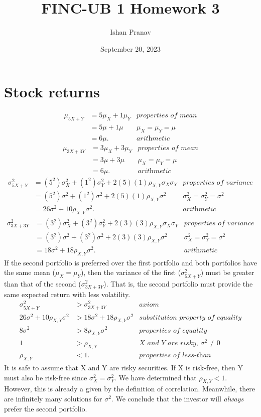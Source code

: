 \documentclass[12pt]{article}
\title{FINC-UB 1 Homework 3}
\author{Ishan Pranav}
\date{September 20, 2023}
\begin{document}
\maketitle
\section{Stock returns}
\begin{align*}
\mu_{5X+Y}
&=5\mu_X+1\mu_Y&\textit{properties of mean}\\
&=5\mu+1\mu&\textit{$\mu_X=\mu_Y=\mu$}\\
&=6\mu.&\textit{arithmetic}
\end{align*}
\begin{align*}
\mu_{3X+3Y}
&=3\mu_X+3\mu_Y&\textit{properties of mean}\\
&=3\mu+3\mu&\textit{$\mu_X=\mu_Y=\mu$}\\
&=6\mu.&\textit{arithmetic}
\end{align*}
\begin{align*}
\sigma_{5X+Y}^2
&=(5^2)\sigma_X^2+(1^2)\sigma_Y^2+2(5)(1)\rho_{X,Y}\sigma_X\sigma_Y&\textit{properties of variance}\\
&=(5^2)\sigma^2+(1^2)\sigma^2+2(5)(1)\rho_{X,Y}\sigma^2&\textit{$\sigma_X^2=\sigma_Y^2=\sigma^2$}\\
&=26\sigma^2+10\rho_{X,Y}\sigma^2.&\textit{arithmetic}
\end{align*}
\begin{align*}
\sigma_{3X+3Y}^2
&=(3^2)\sigma_X^2+(3^2)\sigma_Y^2+2(3)(3)\rho_{X,Y}\sigma_X\sigma_Y&\textit{properties of variance}\\
&=(3^2)\sigma^2+(3^2)\sigma^2+2(3)(3)\rho_{X,Y}\sigma^2&\textit{$\sigma_X^2=\sigma_Y^2=\sigma^2$}\\
&=18\sigma^2+18\rho_{X,Y}\sigma^2.&\textit{arithmetic}
\end{align*}
If the second portfolio is preferred over the first portfolio and both portfolios have the same mean ($\mu_X=\mu_Y$), then the variance of the first ($\sigma_{5X+Y}^2$) must be greater than that of the second ($\sigma_{3X+3Y}^2$). That is, the second portfolio must provide the same expected return with less volatility.
\begin{align*}
\sigma_{5X+Y}^2&>\sigma_{3X+3Y}^2&\textit{axiom}\\
26\sigma^2+10\rho_{X,Y}\sigma^2&>18\sigma^2+18\rho_{X,Y}\sigma^2&\textit{substitution property of equality}\\
8\sigma^2&>8\rho_{X,Y}\sigma^2&\textit{properties of equality}\\
1&>\rho_{X,Y}&\textit{X and Y are risky, $\sigma^2\neq 0$}\\
\rho_{X,Y}&<1.&\textit{properties of less-than}
\end{align*}
It is safe to assume that X and Y are risky securities. If X is risk-free, then Y must also be risk-free since $\sigma_X^2=\sigma_Y^2$. We have determined that $\rho_{X,Y}<1$. However, this is already a given by the definition of correlation. Meanwhile, there are infinitely many solutions for $\sigma^2$. We conclude that the investor will \textit{always} prefer the second portfolio.
\end{document}

